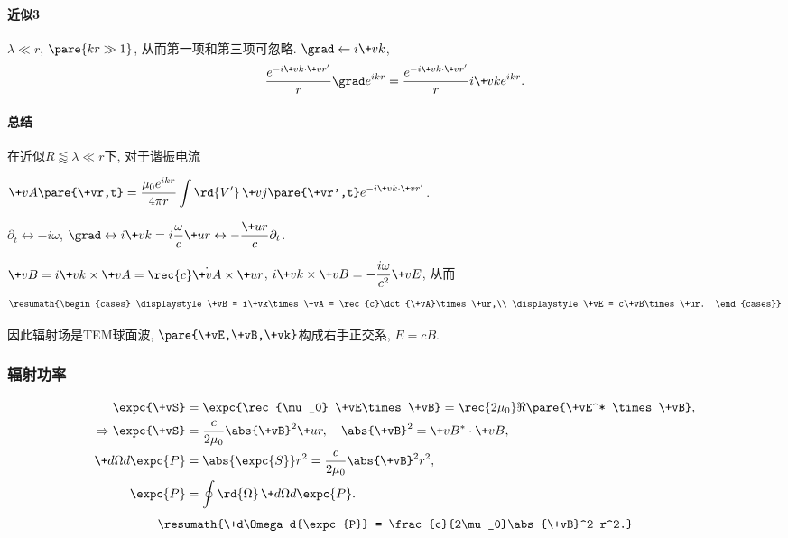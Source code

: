 \documentclass[hidelinks]{ctexart}
\begin{document}

\paragraph{近似3} %
\label{par:近似3}

$\lambda \ll r$, $\pare{kr \gg 1}$, 从而第一项和第三项可忽略. $\grad \leftarrow i\+vk$,
\[ \frac{e^{-i\+vk\cdot \+vr'}}{r}\grad e^{ikr} = \frac{e^{-i\+vk\cdot \+vr'}}{r}i\+vk e^{ikr}. \]


\paragraph{总结} %
\label{par:总结}

在近似$R\lessapprox \lambda \ll r$下, 对于谐振电流
\begin{cenum}
    \item $\displaystyle \+vA\pare{\+vr,t} = \frac{\mu_0 e^{ikr}}{4\pi r}\int \rd{V'}\, \+vj\pare{\+vr',t} e^{-i \+vk\cdot \+vr'}$.
    \item $\displaystyle \partial_t \leftrightarrow -i\omega$, $\displaystyle \grad \leftrightarrow i\+vk = i\frac{\omega}{c}\+ur \leftrightarrow -\frac{\+ur}{c}\partial_t$.
    \item $\displaystyle \+vB = i\+vk\times \+vA = \rec{c}\dot{\+vA}\times \+ur$, $\displaystyle i\+vk\times \+vB = -\frac{i\omega}{c^2}\+vE$, 从而
    \[ \resumath{\begin{cases}
        \displaystyle \+vB = i\+vk\times \+vA = \rec{c}\dot{\+vA}\times \+ur,\\
        \displaystyle \+vE = c\+vB\times \+ur.
    \end{cases}} \]
\end{cenum}
因此辐射场是TEM球面波, $\pare{\+vE,\+vB,\+vk}$构成右手正交系, $E = cB$.



\subsubsection{辐射功率} %
\label{ssub:辐射功率}
\vspace{-\baselineskip}
\begin{align*}
    \expc{\+vS} &= \expc{\rec{\mu_0} \+vE\times \+vB} = \rec{2\mu_0}\Re\pare{\+vE^* \times \+vB}, \\
    \Rightarrow \expc{\+vS} &= \frac{c}{2\mu_0}\abs{\+vB}^2 \+ur,\quad \abs{\+vB}^2 = \+vB^*\cdot \+vB, \\
    \+d\Omega d{\expc{P}} &= \abs{\expc{S}}r^2 = \frac{c}{2\mu_0}\abs{\+vB}^2 r^2, \\
    \expc{P} &= \oint \rd{\Omega}\,\+d\Omega d{\expc{P}}.
\end{align*}
\[ \resumath{\+d\Omega d{\expc{P}} = \frac{c}{2\mu_0}\abs{\+vB}^2 r^2.} \]
\end{document}
